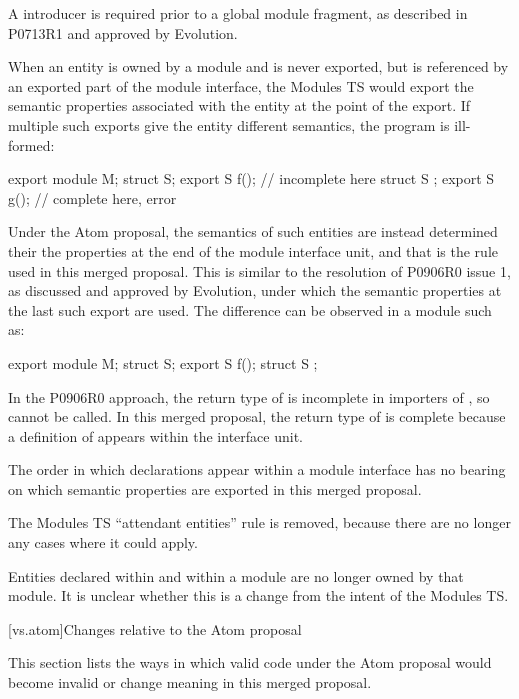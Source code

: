 \pnum
A  introducer is required prior to a global module fragment,
as described in P0713R1 and approved by Evolution.

\pnum
When an entity is owned by a module and is never exported,
but is referenced by an exported part of the module interface,
the Modules TS would export the semantic properties
associated with the entity at the point of the export.
If multiple such exports give the entity different semantics,
the program is ill-formed:

\begin{codeblock}
export module M;
struct S;
export S f();  //  incomplete here
struct S {};
export S g();  //  complete here, error
\end{codeblock}

Under the Atom proposal,
the semantics of such entities
are instead determined their the properties
at the end of the module interface unit,
and that is the rule used in this merged proposal.
This is similar to the resolution of P0906R0 issue 1,
as discussed and approved by Evolution,
under which the semantic properties at the last such export are used.
The difference can be observed in a module such as:

\begin{codeblock}
export module M;
struct S;
export S f();
struct S {};
\end{codeblock}

In the P0906R0 approach,
the return type of  is incomplete
in importers of ,
so  cannot be called.
In this merged proposal,
the return type of  is complete
because a definition of 
appears within the interface unit.
\begin{note}
The order in which declarations appear within a module interface
has no bearing on which semantic properties are exported
in this merged proposal.
\end{note}

The Modules TS ``attendant entities'' rule is removed,
because there are no longer any cases where it could apply.

\pnum
Entities declared within  and 
within a module are no longer owned by that module.
It is unclear whether this is a change from the intent of
the Modules TS.

[vs.atom]{Changes relative to the Atom proposal}

\pnum
This section lists the ways in which valid code under the Atom proposal
would become invalid or change meaning in this merged proposal.

